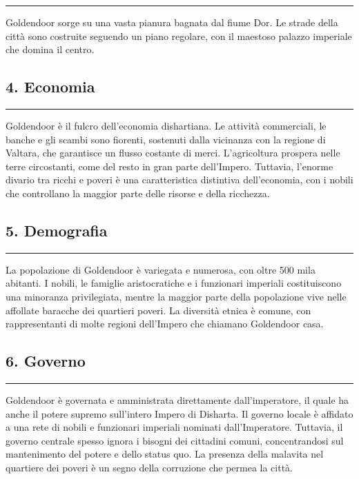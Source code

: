 \begin{center}\rule{0.5\linewidth}{0.5pt}\end{center}

Goldendoor sorge su una vasta pianura bagnata dal fiume Dor. Le strade
della città sono costruite seguendo un piano regolare, con il maestoso
palazzo imperiale che domina il centro.

\subsection{4. Economia}\label{economia}

\begin{center}\rule{0.5\linewidth}{0.5pt}\end{center}

Goldendoor è il fulcro dell'economia dishartiana. Le attività
commerciali, le banche e gli scambi sono fiorenti, sostenuti dalla
vicinanza con la regione di Valtara, che garantisce un flusso costante
di merci. L'agricoltura prospera nelle terre circostanti, come del resto
in gran parte dell'Impero. Tuttavia, l'enorme divario tra ricchi e
poveri è una caratteristica distintiva dell'economia, con i nobili che
controllano la maggior parte delle risorse e della ricchezza.

\subsection{5. Demografia}\label{demografia}

\begin{center}\rule{0.5\linewidth}{0.5pt}\end{center}

La popolazione di Goldendoor è variegata e numerosa, con oltre 500 mila
abitanti. I nobili, le famiglie aristocratiche e i funzionari imperiali
costituiscono una minoranza privilegiata, mentre la maggior parte della
popolazione vive nelle affollate baracche dei quartieri poveri. La
diversità etnica è comune, con rappresentanti di molte regioni
dell'Impero che chiamano Goldendoor casa.

\subsection{6. Governo}\label{governo}

\begin{center}\rule{0.5\linewidth}{0.5pt}\end{center}

Goldendoor è governata e amministrata direttamente dall'imperatore, il
quale ha anche il potere supremo sull'intero Impero di Disharta. Il
governo locale è affidato a una rete di nobili e funzionari imperiali
nominati dall'Imperatore. Tuttavia, il governo centrale spesso ignora i
bisogni dei cittadini comuni, concentrandosi sul mantenimento del potere
e dello status quo. La presenza della malavita nel quartiere dei poveri
è un segno della corruzione che permea la città.

